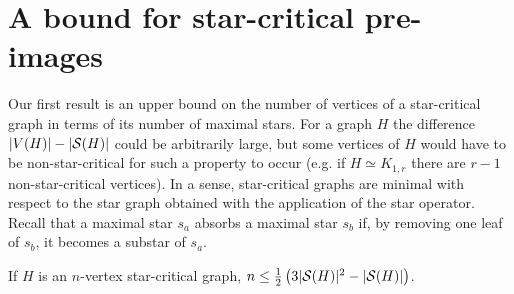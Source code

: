 \section{A bound for star-critical pre-images}

Our first result is an upper bound on the number of vertices of a star-critical graph in terms of its number of maximal stars.
For a graph $H$ the difference $|V(H)| - |\mathcal{S}(H)|$ could be arbitrarily large, but some vertices of $H$ would have to be non-star-critical for such a property to occur (e.g. if $H \simeq K_{1,r}$ there are $r-1$ non-star-critical vertices).
In a sense, star-critical graphs are minimal with respect to the star graph obtained with the application of the star operator.
Recall that a maximal star $s_a$ absorbs a maximal star $s_b$ if, by removing one leaf of $s_b$, it becomes a substar of $s_a$.

\begin{theorem}
    \label{thm:bound}
    If $H$ is an $n$-vertex star-critical graph, $n \leq \frac{1}{2}\left(3|\mathcal{S}(H)|^2 - |\mathcal{S}(H)|\right)$.
\end{theorem}

